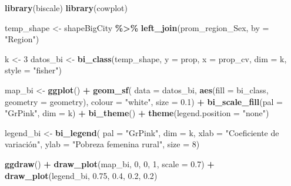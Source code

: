 \documentclass[
  spanish,
  12pt,
]{book}
\newenvironment{Shaded}{\begin{snugshade}}{\end{snugshade}}
\newcommand{\AttributeTok}[1]{\textcolor[rgb]{0.13,0.29,0.53}{#1}}
\newcommand{\DecValTok}[1]{\textcolor[rgb]{0.00,0.00,0.81}{#1}}
\newcommand{\FloatTok}[1]{\textcolor[rgb]{0.00,0.00,0.81}{#1}}
\newcommand{\FunctionTok}[1]{\textcolor[rgb]{0.13,0.29,0.53}{\textbf{#1}}}
\newcommand{\NormalTok}[1]{#1}
\newcommand{\OtherTok}[1]{\textcolor[rgb]{0.56,0.35,0.01}{#1}}
\newcommand{\SpecialCharTok}[1]{\textcolor[rgb]{0.81,0.36,0.00}{\textbf{#1}}}
\newcommand{\StringTok}[1]{\textcolor[rgb]{0.31,0.60,0.02}{#1}}
\newcounter{none} %
\begin{document}
\begin{Shaded}
\begin{Highlighting}[]
\FunctionTok{library}\NormalTok{(biscale)}
\FunctionTok{library}\NormalTok{(cowplot)}

\NormalTok{temp\_shape }\OtherTok{\textless{}{-}}\NormalTok{ shapeBigCity }\SpecialCharTok{\%\textgreater{}\%}
  \FunctionTok{left\_join}\NormalTok{(prom\_region\_Sex, }\AttributeTok{by =} \StringTok{"Region"}\NormalTok{)}

\NormalTok{k }\OtherTok{\textless{}{-}} \DecValTok{3}
\NormalTok{datos\_bi }\OtherTok{\textless{}{-}} \FunctionTok{bi\_class}\NormalTok{(temp\_shape,}
  \AttributeTok{y =}\NormalTok{ prop, }\AttributeTok{x =}\NormalTok{ prop\_cv, }\AttributeTok{dim =}\NormalTok{ k,}
  \AttributeTok{style =} \StringTok{"fisher"}\NormalTok{)}

\NormalTok{map\_bi }\OtherTok{\textless{}{-}} \FunctionTok{ggplot}\NormalTok{() }\SpecialCharTok{+}
  \FunctionTok{geom\_sf}\NormalTok{(}
    \AttributeTok{data =}\NormalTok{ datos\_bi,}
    \FunctionTok{aes}\NormalTok{(}\AttributeTok{fill =}\NormalTok{ bi\_class, }\AttributeTok{geometry =}\NormalTok{ geometry),}
    \AttributeTok{colour =} \StringTok{"white"}\NormalTok{, }\AttributeTok{size =} \FloatTok{0.1}\NormalTok{) }\SpecialCharTok{+}
  \FunctionTok{bi\_scale\_fill}\NormalTok{(}\AttributeTok{pal =} \StringTok{"GrPink"}\NormalTok{, }\AttributeTok{dim =}\NormalTok{ k) }\SpecialCharTok{+}
  \FunctionTok{bi\_theme}\NormalTok{() }\SpecialCharTok{+}
  \FunctionTok{theme}\NormalTok{(}\AttributeTok{legend.position =} \StringTok{"none"}\NormalTok{)}

\NormalTok{legend\_bi }\OtherTok{\textless{}{-}} \FunctionTok{bi\_legend}\NormalTok{(}
  \AttributeTok{pal  =} \StringTok{"GrPink"}\NormalTok{, }\AttributeTok{dim =}\NormalTok{ k,}
  \AttributeTok{xlab =} \StringTok{"Coeficiente de variación"}\NormalTok{,}
  \AttributeTok{ylab =} \StringTok{"Pobreza femenina rural"}\NormalTok{,}
  \AttributeTok{size =} \DecValTok{8}\NormalTok{)}

\FunctionTok{ggdraw}\NormalTok{() }\SpecialCharTok{+}
  \FunctionTok{draw\_plot}\NormalTok{(map\_bi,     }\DecValTok{0}\NormalTok{,    }\DecValTok{0}\NormalTok{,    }\DecValTok{1}\NormalTok{, }\AttributeTok{scale =} \FloatTok{0.7}\NormalTok{) }\SpecialCharTok{+}
  \FunctionTok{draw\_plot}\NormalTok{(legend\_bi,  }\FloatTok{0.75}\NormalTok{, }\FloatTok{0.4}\NormalTok{,  }\FloatTok{0.2}\NormalTok{, }\FloatTok{0.2}\NormalTok{)}
\end{Highlighting}
\end{Shaded}
\end{document}
